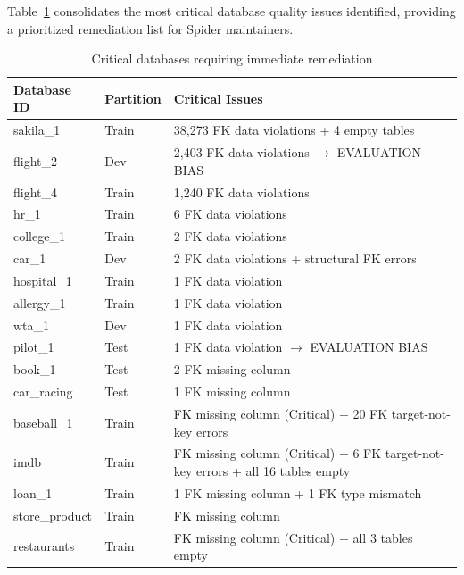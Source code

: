 \documentclass[print]{einformatica}
\begin{document}
Table~\ref{tab:critical_dbs} consolidates the most critical database quality issues identified, providing a prioritized remediation list for Spider maintainers.

\begin{table}[ht]
    \caption{Critical databases requiring immediate remediation}
    \label{tab:critical_dbs}
    \centering
    \footnotesize
    \begin{tabular}{llp{}}
        \toprule
        \textbf{Database ID} & \textbf{Partition} & \textbf{Critical Issues} \\
        \midrule
        sakila\_1 & Train & 38,273 FK data violations + 4 empty tables \\
        flight\_2 & Dev & 2,403 FK data violations $\rightarrow$ EVALUATION BIAS \\
        flight\_4 & Train & 1,240 FK data violations \\
        hr\_1 & Train & 6 FK data violations \\
        college\_1 & Train & 2 FK data violations \\
        car\_1 & Dev & 2 FK data violations + structural FK errors \\
        hospital\_1 & Train & 1 FK data violation \\
        allergy\_1 & Train & 1 FK data violation \\
        wta\_1 & Dev & 1 FK data violation \\
        pilot\_1 & Test & 1 FK data violation $\rightarrow$ EVALUATION BIAS \\
        book\_1 & Test & 2 FK missing column \\
        car\_racing & Test & 1 FK missing column \\
        baseball\_1 & Train & FK missing column (Critical) + 20 FK target-not-key errors \\
        imdb & Train & FK missing column (Critical) + 6 FK target-not-key errors + all 16 tables empty \\
        loan\_1 & Train & 1 FK missing column + 1 FK type mismatch \\
        store\_product & Train & FK missing column \\
        restaurants & Train & FK missing column (Critical) + all 3 tables empty \\
        \bottomrule
    \end{tabular}
\end{table}

\FloatBarrier
\end{document}
